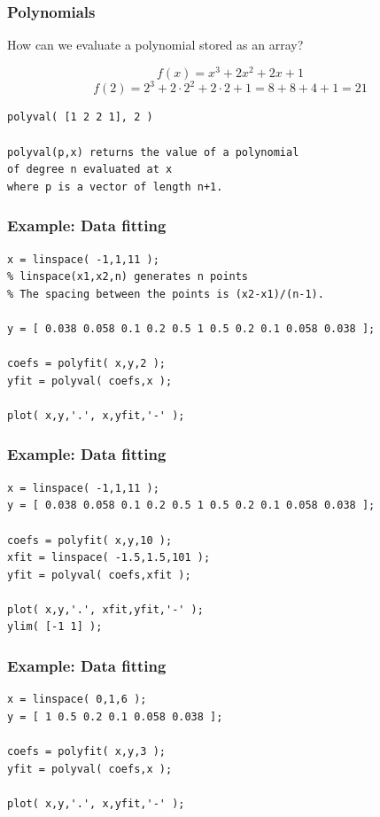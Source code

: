 \documentclass[11pt]{beamer}
\begin{document}
\begin{frame}[fragile]
  \frametitle{Polynomials}
  \Enlarge

  \begin{enumerate}
  \myitem  How can we evaluate a polynomial stored as an array?
  \end{enumerate}
  $$
f(x) = x^{3} + 2 x^{2} + 2 x + 1
  $$
  $$
f(2) = 2^{3} + 2 \cdot 2^{2} + 2 \cdot 2 + 1 = 8 + 8 + 4 + 1 = 21
  $$
  \begin{Verbatim}
polyval( [1 2 2 1], 2 )

polyval(p,x) returns the value of a polynomial 
of degree n evaluated at x 
where p is a vector of length n+1.
  \end{Verbatim}
\end{frame}

\begin{frame}[fragile]
  \frametitle{Example:  Data fitting}

  \begin{Verbatim}
x = linspace( -1,1,11 );
% linspace(x1,x2,n) generates n points
% The spacing between the points is (x2-x1)/(n-1).

y = [ 0.038 0.058 0.1 0.2 0.5 1 0.5 0.2 0.1 0.058 0.038 ];

coefs = polyfit( x,y,2 );
yfit = polyval( coefs,x );

plot( x,y,'.', x,yfit,'-' );
  \end{Verbatim}
\end{frame}

\begin{frame}[fragile]
  \frametitle{Example:  Data fitting}

  \begin{Verbatim}
x = linspace( -1,1,11 );
y = [ 0.038 0.058 0.1 0.2 0.5 1 0.5 0.2 0.1 0.058 0.038 ];

coefs = polyfit( x,y,10 );
xfit = linspace( -1.5,1.5,101 );
yfit = polyval( coefs,xfit );

plot( x,y,'.', xfit,yfit,'-' );
ylim( [-1 1] );
  \end{Verbatim}
\end{frame}

\begin{frame}[fragile]
  \frametitle{Example:  Data fitting}

  \begin{Verbatim}
x = linspace( 0,1,6 );
y = [ 1 0.5 0.2 0.1 0.058 0.038 ];

coefs = polyfit( x,y,3 );
yfit = polyval( coefs,x );

plot( x,y,'.', x,yfit,'-' );
  \end{Verbatim}
\end{frame}
\end{document}
